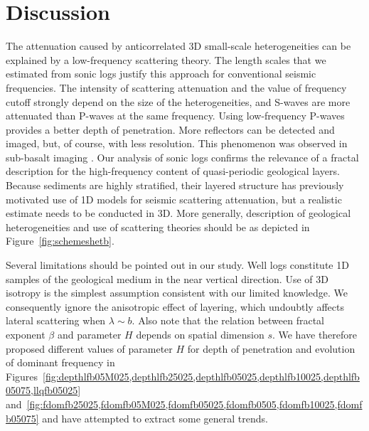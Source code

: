 \section{Discussion}


The attenuation caused by anticorrelated 3D small-scale heterogeneities
can be explained by a low-frequency scattering theory.
The length scales that we estimated from sonic logs justify this approach 
for conventional seismic frequencies.
The intensity of scattering attenuation and the value of
frequency cutoff strongly depend on the size of the heterogeneities, and
S-waves are more attenuated than P-waves at the same frequency.
Using low-frequency P-waves provides a better depth of penetration. More reflectors can be detected and imaged,
but, of course, with less resolution. This phenomenon was observed  
in sub-basalt imaging \cite[]{Ziolkowski_HGJDHLL03}.
Our analysis of sonic logs confirms the relevance
of a fractal description for the high-frequency content of quasi-periodic geological layers.
Because sediments are highly stratified, their layered structure
has previously motivated use of 1D models for seismic scattering attenuation,
but a realistic estimate needs to be conducted in 3D.
More generally, description of geological heterogeneities and 
use of scattering theories should be as depicted in Figure~\ref{fig:schemeshetb}.

Several limitations should be pointed out in our study. 
Well logs constitute 1D samples of the geological medium in the near vertical direction.
Use of 3D isotropy is the simplest assumption 
consistent with our limited knowledge.
We consequently ignore the anisotropic effect of layering, which undoubtly affects lateral scattering when $\lambda\sim b$.
Also note that the relation between fractal exponent $\beta$
and parameter $H$ depends on spatial dimension $s$.
We have therefore proposed different values of parameter $H$ for depth of penetration and evolution of dominant frequency
in Figures~\ref{fig:depthlfb05M025,depthlfb25025,depthlfb05025,depthlfb10025,depthlfb05075,llqfb05025}
and~\ref{fig:fdomfb25025,fdomfb05M025,fdomfb05025,fdomfb0505,fdomfb10025,fdomfb05075}
and have attempted to extract some general trends.

